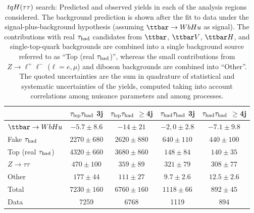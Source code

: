 \begin{table}[htbp]
\small
\begin{center}
\begin{tabular}{l*{4}{c}}
\hline\hline
 & $\tau_{\mathrm{lep}} \tau_{\mathrm{had}}$ 3j & $\tau_{\mathrm{lep}} \tau_{\mathrm{had}}$ $\geq$4j & $\tau_{\mathrm{had}} \tau_{\mathrm{had}}$ 3j &  $\tau_{\mathrm{had}} \tau_{\mathrm{had}}$ $\geq$4j \\
\hline
$\Hu$  &   $ -5.7 \pm 8.6 $ &   $ -14 \pm 21 $ &   $ -2,0 \pm 2.8 $ &   $ -7.1 \pm 9.8 $ \\ 
\hline
Fake $\tau_{\mathrm{had}}$  &   $ 2270 \pm 680 $ &   $ 2620 \pm 880 $ &   $ 640 \pm 110 $ &   $ 440 \pm 100 $ \\
Top (real $\tau_{\mathrm{had}}$)  &   $ 4320 \pm 660 $ &   $ 3680 \pm 860 $ &   $ 148 \pm 84 $ &   $ 140 \pm 35 $ \\ 
$Z \to \tau\tau$  &   $ 470 \pm 100 $ &   $ 359 \pm 89 $ &   $ 321 \pm 79 $ &   $ 308 \pm 77 $ \\ 
Other  &   $ 177 \pm 44 $ &   $ 111 \pm 27 $ &   $ 9.7 \pm 2.6 $ &   $ 12.5 \pm 2.6 $ \\ 
\hline
Total  &   $ 7230 \pm 160 $ &   $ 6760 \pm 160 $ &   $ 1118 \pm 66 $ &   $ 892 \pm 45 $ \\ 
\hline
Data  & 7259  & 6768  & 1119  & 894  \\ 
\hline\hline    
\end{tabular}

%
\end{center}
\caption{
$tqH(\tau\tau)$ search: Predicted and observed yields in each of the analysis regions considered.
The background prediction is shown after the fit to data under the signal-plus-background hypothesis 
(assuming $\Hu$ as signal).
The contributions with real $\tau_{\mathrm{had}}$ candidates from $\ttbar$,  $\ttbar V$, $\ttbar H$, and single-top-quark backgrounds are combined into
a single background source referred to as ``Top (real $\tau_{\mathrm{had}}$)'', whereas the small contributions from 
$Z\to \ell^+\ell^-$ ($\ell = e, \mu$) and diboson backgrounds are combined into ``Other''. 
The quoted uncertainties are the sum in quadrature of statistical and systematic uncertainties of the yields, 
computed taking into account correlations among nuisance parameters and among processes.
}
\label{tab:Htautau_Postfit_Yields_Unblind_Hu}
\end{table} 

\clearpage

